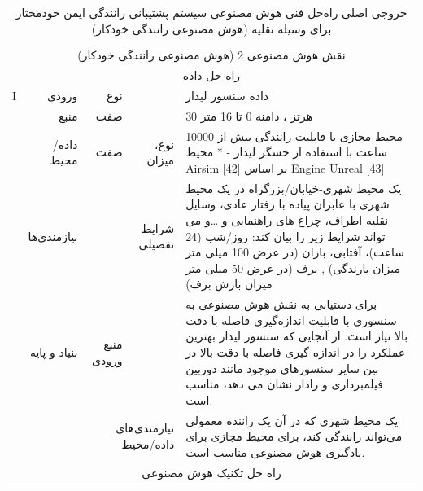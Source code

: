 \documentclass[a4paper,10pt]{article}
\begin{document}
    \begin{table}[htbp]

        \centering
        \caption{خروجی اصلی راه‌حل فنی هوش مصنوعی سیستم پشتیبانی رانندگی ایمن خودمختار برای وسیله نقلیه (هوش مصنوعی رانندگی خودکار)}
        \begin{tabularx}{\textwidth}{c c c c X}

            \vspace{-10pt}\\

            \hline

            \multicolumn{5}{c}{نقش هوش مصنوعی 2 (هوش مصنوعی رانندگی خودکار)}\\
            
            \hline

            \multicolumn{5}{c}{راه حل داده}\\

            \multicolumn{1}{c}{I} & \multicolumn{1}{r}{ورودی} & \multicolumn{1}{r}{نوع} &  & داده سنسور لیدار \\
            & \multicolumn{1}{r}{منبع} & \multicolumn{1}{r}{صفت} &  & 30 هرتز ، دامنه 0 تا 16 متر \\
            & \multicolumn{1}{r}{داده/محیط} & \multicolumn{1}{r}{صفت} & \multicolumn{1}{r}{نوع، میزان} & محیط مجازی با قابلیت رانندگی بیش از 10000 ساعت با استفاده از حسگر لیدار - * محیط Airsim [42] بر اساس Engine Unreal [43] \\
            & \multicolumn{1}{r}{نیازمندی‌ها} &  & \multicolumn{1}{r}{شرایط تفصیلی} & یک محیط شهری-خیابان/بزرگراه در یک محیط شهری با عابران پیاده با رفتار عادی، وسایل نقلیه اطراف، چراغ های راهنمایی و \dots و می تواند شرایط زیر را بیان کند: روز/شب (24 ساعت)، آفتابی، باران (در عرض 100 میلی متر میزان بارندگی) , برف (در عرض 50 میلی متر میزان بارش برف) \\
            & \multicolumn{1}{r}{بنیاد و پایه} & \multicolumn{1}{r}{منبع ورودی} &  & برای دستیابی به نقش هوش مصنوعی به سنسوری با قابلیت اندازه‌گیری فاصله با دقت بالا نیاز است. از آنجایی که سنسور لیدار بهترین عملکرد را در اندازه گیری فاصله با دقت بالا در بین سایر سنسورهای موجود مانند دوربین فیلمبرداری و رادار نشان می دهد، مناسب است. \\
            &  & \multicolumn{2}{r}{نیازمندی‌های داده/محیط} & یک محیط شهری که در آن یک راننده معمولی می‌تواند رانندگی کند، برای محیط مجازی برای یادگیری هوش مصنوعی مناسب است. \\

            \multicolumn{5}{c}{راه حل تکنیک هوش مصنوعی}\\


\end{tabularx}
\end{table}
\end{document}
